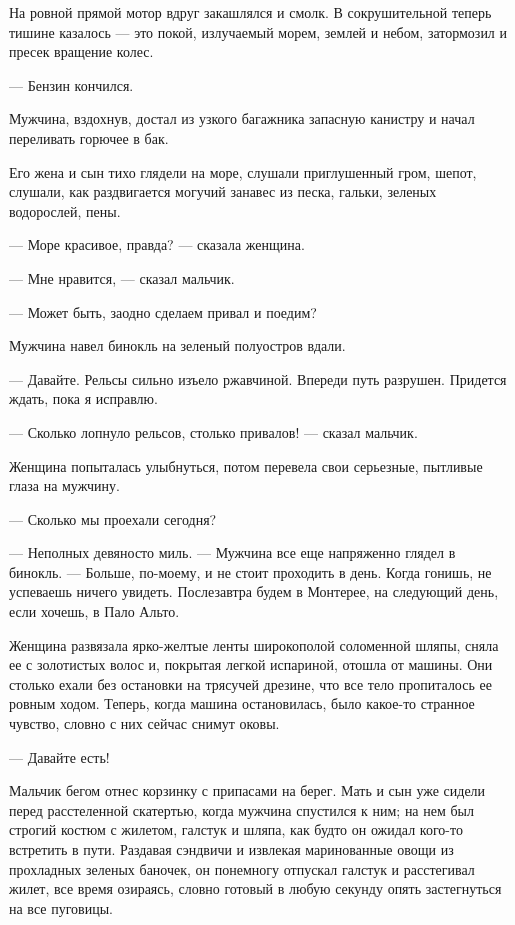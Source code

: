 На ровной прямой мотор вдруг закашлялся и смолк. В сокрушительной теперь тишине
казалось — это покой, излучаемый морем, землей и небом, затормозил и пресек
вращение колес.

— Бензин кончился.

Мужчина, вздохнув, достал из узкого багажника запасную канистру и начал
переливать горючее в бак.

Его жена и сын тихо глядели на море, слушали приглушенный гром, шепот, слушали,
как раздвигается могучий занавес из песка, гальки, зеленых водорослей, пены.

— Море красивое, правда? — сказала женщина.

— Мне нравится, — сказал мальчик.

— Может быть, заодно сделаем привал и поедим?

Мужчина навел бинокль на зеленый полуостров вдали.

— Давайте. Рельсы сильно изъело ржавчиной. Впереди путь разрушен. Придется
ждать, пока я исправлю.

— Сколько лопнуло рельсов, столько привалов! — сказал мальчик.

Женщина попыталась улыбнуться, потом перевела свои серьезные, пытливые глаза на
мужчину.

— Сколько мы проехали сегодня?

— Неполных девяносто миль. — Мужчина все еще напряженно глядел в бинокль. —
Больше, по-моему, и не стоит проходить в день. Когда гонишь, не успеваешь
ничего увидеть. Послезавтра будем в Монтерее, на следующий день, если хочешь, в
Пало Альто.

Женщина развязала ярко-желтые ленты широкополой соломенной шляпы, сняла ее с
золотистых волос и, покрытая легкой испариной, отошла от машины. Они столько
ехали без остановки на трясучей дрезине, что все тело пропиталось ее ровным
ходом. Теперь, когда машина остановилась, было какое-то странное чувство,
словно с них сейчас снимут оковы.

— Давайте есть!

Мальчик бегом отнес корзинку с припасами на берег. Мать и сын уже сидели перед
расстеленной скатертью, когда мужчина спустился к ним; на нем был строгий
костюм с жилетом, галстук и шляпа, как будто он ожидал кого-то встретить в
пути. Раздавая сэндвичи и извлекая маринованные овощи из прохладных зеленых
баночек, он понемногу отпускал галстук и расстегивал жилет, все время озираясь,
словно готовый в любую секунду опять застегнуться на все пуговицы.

